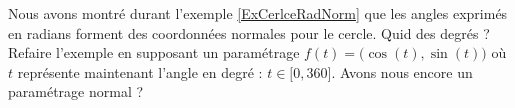 \begin{exercice}\label{exoGeomAnal-0003}

Nous avons montré durant l'exemple \ref{ExCerlceRadNorm} que les angles exprimés en radians forment des coordonnées normales pour le cercle. Quid des degrés ? Refaire l'exemple en supposant un paramétrage $f(t)=\big( \cos(t),\sin(t) \big)$ où $t$ représente maintenant l'angle en degré : $t\in\mathopen[ 0 , 360 \mathclose]$. Avons nous encore un paramétrage normal ?

\end{exercice}
